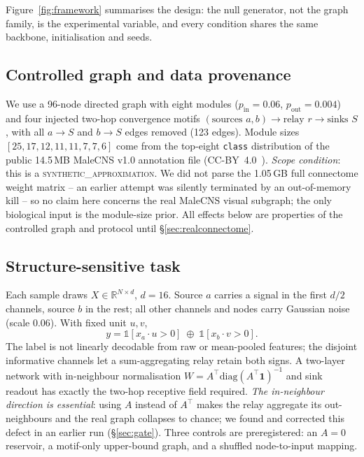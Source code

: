 \documentclass[10pt,twocolumn,letterpaper]{article}
\begin{document}
Figure~\ref{fig:framework} summarises the design: the null generator, not the
graph family, is the experimental variable, and every condition shares the
same backbone, initialisation and seeds.

\subsection{Controlled graph and data provenance}
\label{sec:graph}

We use a 96-node directed graph with eight modules ($p_{\text{in}}=0.06$,
$p_{\text{out}}=0.004$) and four injected two-hop convergence motifs
$(\text{sources } a,b)\to \text{relay } r\to \text{sinks } S$, with all
$a\!\to\!S$ and $b\!\to\!S$ edges removed (123 edges). Module sizes
$[25,17,12,11,11,7,7,6]$ come from the top-eight \texttt{class} distribution
of the public 14.5\,MB MaleCNS v1.0 annotation file
(CC-BY~4.0~\cite{malecns2026}). \emph{Scope condition}: this is a
\textsc{synthetic\_approximation}. We did not parse the 1.05\,GB full
connectome weight matrix -- an earlier attempt was silently terminated by an
out-of-memory kill -- so no claim here concerns the real MaleCNS visual
subgraph; the only biological input is the module-size prior. All effects
below are properties of the controlled graph and protocol until
\S\ref{sec:realconnectome}.

\subsection{Structure-sensitive task}
\label{sec:task}

Each sample draws $X\in\mathbb{R}^{N\times d}$, $d=16$. Source $a$ carries a
signal in the first $d/2$ channels, source $b$ in the rest; all other channels
and nodes carry Gaussian noise (scale $0.06$). With fixed unit $u,v$,
\begin{equation}
y = \mathbb{1}[x_a\!\cdot\! u > 0]\;\oplus\;\mathbb{1}[x_b\!\cdot\! v > 0].
\end{equation}
The label is not linearly decodable from raw or mean-pooled features; the
disjoint informative channels let a sum-aggregating relay retain both signs.
A two-layer network with in-neighbour normalisation
$W = A^{\top}\mathrm{diag}(A^{\top}\mathbf{1})^{-1}$ and sink readout has
exactly the two-hop receptive field required. \emph{The in-neighbour direction
is essential}: using $A$ instead of $A^{\top}$ makes the relay aggregate its
out-neighbours and the real graph collapses to chance; we found and corrected
this defect in an earlier run (\S\ref{sec:gate}). Three controls are
preregistered: an $A=0$ reservoir, a motif-only upper-bound graph, and a
shuffled node-to-input mapping.
\end{document}
